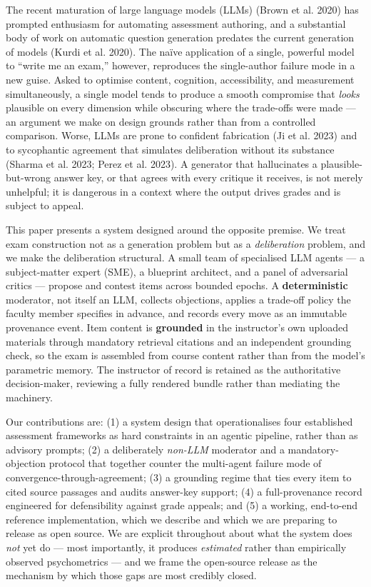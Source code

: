 \documentclass[
  11pt,
  letterpaper,
]{article}
\begin{document}
The recent maturation of large language models (LLMs) ({Brown et al.}
2020) has prompted enthusiasm for automating assessment authoring, and a
substantial body of work on automatic question generation predates the
current generation of models (Kurdi et al. 2020). The naïve application
of a single, powerful model to ``write me an exam,'' however, reproduces
the single-author failure mode in a new guise. Asked to optimise
content, cognition, accessibility, and measurement simultaneously, a
single model tends to produce a smooth compromise that \emph{looks}
plausible on every dimension while obscuring where the trade-offs were
made --- an argument we make on design grounds rather than from a
controlled comparison. Worse, LLMs are prone to confident fabrication
(Ji et al. 2023) and to sycophantic agreement that simulates
deliberation without its substance ({Sharma et al.} 2023; {Perez et al.}
2023). A generator that hallucinates a plausible-but-wrong answer key,
or that agrees with every critique it receives, is not merely unhelpful;
it is dangerous in a context where the output drives grades and is
subject to appeal.

This paper presents a system designed around the opposite premise. We
treat exam construction not as a generation problem but as a
\emph{deliberation} problem, and we make the deliberation structural. A
small team of specialised LLM agents --- a subject-matter expert (SME),
a blueprint architect, and a panel of adversarial critics --- propose
and contest items across bounded epochs. A \textbf{deterministic}
moderator, not itself an LLM, collects objections, applies a trade-off
policy the faculty member specifies in advance, and records every move
as an immutable provenance event. Item content is \textbf{grounded} in
the instructor's own uploaded materials through mandatory retrieval
citations and an independent grounding check, so the exam is assembled
from course content rather than from the model's parametric memory. The
instructor of record is retained as the authoritative decision-maker,
reviewing a fully rendered bundle rather than mediating the machinery.

Our contributions are: (1) a system design that operationalises four
established assessment frameworks as hard constraints in an agentic
pipeline, rather than as advisory prompts; (2) a deliberately
\emph{non-LLM} moderator and a mandatory-objection protocol that
together counter the multi-agent failure mode of
convergence-through-agreement; (3) a grounding regime that ties every
item to cited source passages and audits answer-key support; (4) a
full-provenance record engineered for defensibility against grade
appeals; and (5) a working, end-to-end reference implementation, which
we describe and which we are preparing to release as open source. We are
explicit throughout about what the system does \emph{not} yet do ---
most importantly, it produces \emph{estimated} rather than empirically
observed psychometrics --- and we frame the open-source release as the
mechanism by which those gaps are most credibly closed.
\end{document}
